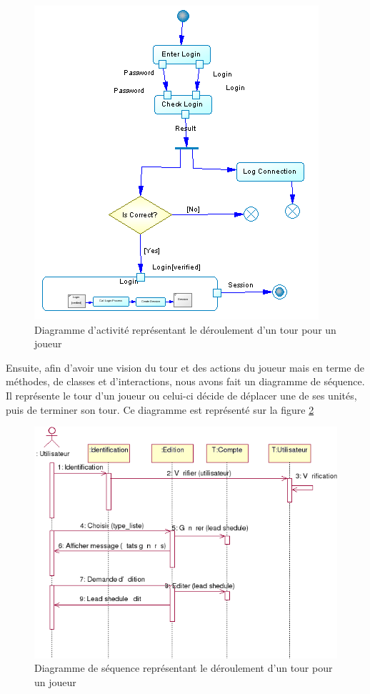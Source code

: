 \documentclass[12pt]{article}
\begin{document}
\begin{figure}[!h] 
\centerline{\includegraphics[scale=0.60]{activite_tour_ex.gif}}
   \caption{\label{étiquette} Diagramme d'activité représentant le déroulement d'un tour pour un joueur}
\label{activiteTour}
\end{figure}

Ensuite, afin d'avoir une vision du tour et des actions du joueur mais en terme de méthodes, de classes et d'interactions, nous avons fait un diagramme de séquence. Il représente le tour d'un joueur ou celui-ci décide de déplacer une de ses unités, puis de terminer son tour. Ce diagramme est représenté sur la figure \ref{sequenceTour}

\begin{figure}[!h] 
\centerline{\includegraphics[scale=0.60]{sequence_tour_ex.png}}
   \caption{\label{étiquette} Diagramme de séquence représentant le déroulement d'un tour pour un joueur}
\label{sequenceTour}
\end{figure}
\end{document}

